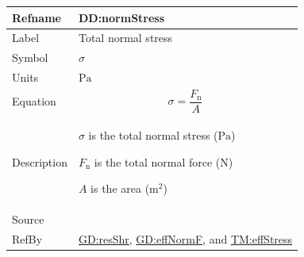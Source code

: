 \documentclass[12pt]{article}
\begin{document}
\medskip
\noindent
\begin{minipage}{\textwidth}
\begin{tabular}{>{\raggedright}p{}>{\raggedright\arraybackslash}p{}}
\toprule \textbf{Refname} & \textbf{DD:normStress}
\label{DD:normStress}
\\ \midrule
Label & Total normal stress
        
\\ \midrule
Symbol & $σ$
         
\\ \midrule
Units & ${\text{Pa}}$
        
\\ \midrule
Equation & \begin{displaymath}
           σ=\frac{{F_{\text{n}}}}{A}
           \end{displaymath}
\\ \midrule
Description & \begin{symbDescription}
              \item{$σ$ is the total normal stress (${\text{Pa}}$)}
              \item{${F_{\text{n}}}$ is the total normal force (${\text{N}}$)}
              \item{$A$ is the area (${\text{m}^{2}}$)}
              \end{symbDescription}
\\ \midrule
Source & \cite{huston2008}
         
\\ \midrule
RefBy & \hyperref[GD:resShr]{GD:resShr}, \hyperref[GD:effNormF]{GD:effNormF}, and \hyperref[TM:effStress]{TM:effStress}
        
\\ \bottomrule
\end{tabular}
\end{minipage}
\end{document}
